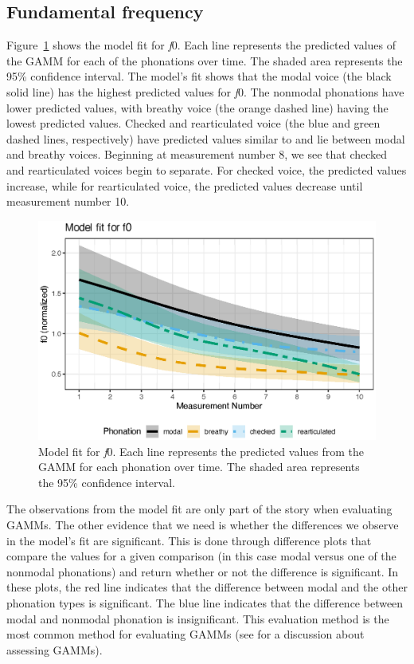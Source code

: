 \subsection{Fundamental frequency} \label{sec:model_f0}

Figure~\ref{fig:f0_model_fit} shows the model fit for \textit{f}0. Each line represents the predicted values of the GAMM for each of the phonations over time. The shaded area represents the 95\% confidence interval. The model's fit shows that the modal voice (the black solid line) has the highest predicted values for \textit{f}0. The nonmodal phonations have lower predicted values, with breathy voice (the orange dashed line) having the lowest predicted values. Checked and rearticulated voice (the blue and green dashed lines, respectively) have predicted values similar to and lie between modal and breathy voices. Beginning at measurement number 8, we see that checked and rearticulated voices begin to separate. For checked voice, the predicted values increase, while for rearticulated voice, the predicted values decrease until measurement number 10.

\begin{figure}[h!]
    \centering
    \includegraphics[width = \linewidth]{images/LCH_GAMMs/f0_model_fit.eps}
    \caption{Model fit for \textit{f}0. Each line represents the predicted values from the GAMM for each phonation over time. The shaded area represents the 95\% confidence interval.}
    \label{fig:f0_model_fit}
\end{figure}

The observations from the model fit are only part of the story when evaluating GAMMs. The other evidence that we need is whether the differences we observe in the model's fit are significant. This is done through difference plots that compare the values for a given comparison (in this case modal versus one of the nonmodal phonations) and return whether or not the difference is significant. In these plots, the red line indicates that the difference between modal and the other phonation types is significant. The blue line indicates that the difference between modal and nonmodal phonation is insignificant. This evaluation method is the most common method for evaluating GAMMs (see \cite{soskuthyEvaluatingGeneralisedAdditive2021} for a discussion about assessing GAMMs). 

